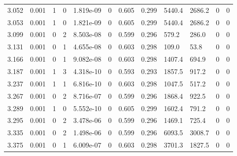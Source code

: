 \documentclass[preview]{standalone}
\begin{document}
{{{\begin{tabular}{L{1.2cm}C{1.2cm} C{0.3cm}C{0.5cm} C{1.4cm}C{1.4cm} C{1.4cm}C{1.4cm} C{1.6cm}C{1.6cm} C{1.6cm}C{1.6cm}}
  3.052  &  0.001  & 1     &  0 &  1.819e-09  & 0  &  0.605&   0.299& 5440.4 & 2686.2   &  0 & 0  \\ 
  3.053  &  0.001  & 1     &  0 &  1.821e-09  & 0  &  0.605&   0.299& 5440.4 & 2686.2   &  0 & 0  \\ 
  3.099  &  0.001  & 0     &  2 &  8.503e-08  & 0  &  0.599&   0.296& 579.2 & 286.0   &  0 & 0  \\ 
  3.131  &  0.001  & 0     &  1 &  4.655e-08  & 0  &  0.603&   0.298& 109.0 & 53.8   &  0 & 0  \\ 
  3.166  &  0.001  & 0     &  1 &  9.082e-08  & 0  &  0.603&   0.298& 1407.4 & 694.9   &  0 & 0  \\ 
  3.187  &  0.001  & 1     &  3 &  4.318e-10  & 0  &  0.593&   0.293& 1857.5 & 917.2   &  0 & 0  \\ 
  3.237  &  0.001  & 1     &  1 &  6.816e-10  & 0  &  0.603&   0.298& 1047.5 & 517.2   &  0 & 0  \\ 
  3.267  &  0.001  & 0     &  2 &  8.716e-07  & 0  &  0.599&   0.296& 1868.4 & 922.5   &  0 & 0  \\ 
  3.289  &  0.001  & 1     &  0 &  5.552e-10  & 0  &  0.605&   0.299& 1602.4 & 791.2   &  0 & 0  \\ 
  3.295  &  0.001  & 0     &  2 &  3.478e-06  & 0  &  0.599&   0.296& 1469.1 & 725.4   &  0 & 0  \\ 
  3.335  &  0.001  & 0     &  2 &  1.498e-06  & 0  &  0.599&   0.296& 6093.5 & 3008.7   &  0 & 0  \\ 
  3.375  &  0.001  & 0     &  1 &  6.009e-07  & 0  &  0.603&   0.298& 3701.3 & 1827.5   &  0 & 0  \\ 
\hline 
\end{tabular} 

}}}
\end{document}
